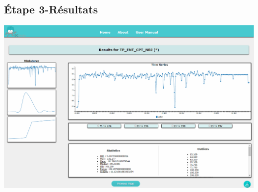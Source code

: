 	\subsection{Étape 3-Résultats}
			\begin{center}\includegraphics[scale=0.45]{fenetre3.png}\end{center}
			
